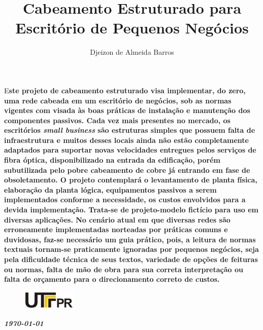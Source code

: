 \documentclass[	DIV=calc,%
							paper=a4,%
							fontsize=12pt,%
							onecolumn]{scrartcl}	 					%
\title{Cabeamento Estruturado para Escritório de Pequenos Negócios}
\author{Djeizon de Almeida Barros}  	%
\date{}																				%
\newcommand{\initial}[1]{%
     \lettrine[lines=3,lhang=0.3,nindent=0em]{
     				\color{DarkBlue}
     				{\textsf{#1}}}{}}
\begin{document}
\maketitle
\thispagestyle{fancy} 	
\thispagestyle{empty}		%





\initial{E}\textbf{ste projeto de cabeamento estruturado visa implementar, do zero, uma rede cabeada em um escritório de negócios, sob as normas vigentes com visada às boas práticas de instalação e manutenção dos componentes passivos. Cada vez mais presentes no mercado, os escritórios \textit{small business} são estruturas simples que possuem falta de infraestrutura e muitos desses locais ainda não estão completamente adaptados para suportar novas velocidades entregues pelos serviços de fibra óptica, disponibilizado na entrada da edificação, porém subutilizada pelo pobre cabeamento de cobre já entrando em fase de obsoletamento. O projeto contemplará o levantamento de planta física, elaboração da planta lógica, equipamentos passivos a serem implementados conforme a necessidade, os custos envolvidos para a devida implementação. Trata-se de projeto-modelo fictício para uso em diversas aplicações. No cenário atual em que diversas redes são erroneamente implementadas norteadas por práticas comuns e duvidosas, faz-se necessário um guia prático, pois, a leitura de normas textuais tornam-se praticamente ignoradas por pequenos negócios, seja pela dificuldade técnica de seus textos, variedade de opções de feituras ou normas, falta de mão de obra para sua correta interpretação ou falta de orçamento para o direcionamento correto de custos.}


\begin{figure}
	\centering
	\includegraphics{utfpr}
\end{figure}

\vspace{2cm}
\centerline{\textit{\textbf{\today}}}

\clearpage
    \renewcommand*\listfigurename{Lista de figuras}
\listoffigures
\end{document}
